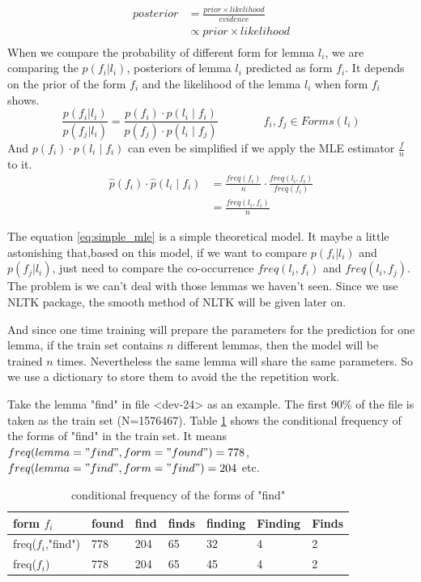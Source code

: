 \documentclass[a4paper]{article}
\begin{document}
{\begin{align*}
posterior  &= \frac{prior \times likelihood}{evidence} \\
           &\propto  prior \times likelihood \\
\end{align*}
When we compare the probability of different form for lemma $l_i$, we are comparing the $p(f_i|l_i)$, posteriors  of lemma $l_i$ predicted as form $f_i$. It depends on the prior of the form $f_i$ and the likelihood of the lemma $l_i$ when form $f_i$ shows.
\begin{equation}
\frac{p(f_i|l_i)}{p(f_j|l_i)} = \frac{p(f_i) \cdot p(l_i \mid f_i)}{  p(f_j) \cdot p(l_i \mid f_j) } \qquad \qquad  f_i,f_j \in Forms(l_i)
\end{equation}
And $p(f_i) \cdot p(l_i \mid f_i)$ can even be simplified if we apply the MLE estimator $\frac{f}{n}$ to it.
\begin{equation} 
\label{eq:simple_mle}
\begin{aligned}
\hat{p}(f_i) \cdot \hat{p}(l_i \mid f_i) &= \frac{freq(f_i)}{n} \cdot \frac{freq(l_i, f_i)}{freq(f_i)} \\
&= \frac{freq(l_i, f_i)}{n}
\end{aligned}
\end{equation}

The equation \ref{eq:simple_mle} is a simple theoretical model. It maybe a little astonishing that,based on this model, if we want to compare $p(f_i|l_i)$ and $p(f_j|l_i)$, just need to compare the co-occurrence $freq(l_i,f_i)$ and $freq(l_i,f_j)$.  The problem is we can't deal with those lemmas we haven't seen. Since we use NLTK package, the smooth method of NLTK will be given later on. 

And since one time training will prepare the parameters for the prediction for one lemma, if the train set contains $n$ different lemmas, then the model will be trained $n$ times. Nevertheless the same lemma will share the same parameters. So we use a dictionary to store them to avoid the the repetition work.


Take the lemma "find" in file <dev-24> as an example. The first 90\% of the file is taken as the train set (N=1576467). Table \ref{tb:cfd_find} shows the conditional frequency of the forms of "find" in the train set. It means $freq(lemma="find", form="found")=778$, $freq(lemma="find",form="find")=204$ etc.

\begin{table}[htb]
\centering
\begin{tabular}{|l|llllll|}
\hline
form $f_i$       & found & find & finds & finding & Finding & Finds \\ \hline
freq($f_i$,"find") & 778   & 204  & 65    & 32      & 4       & 2     \\ \hline
freq($f_i$) & 778   & 204  & 65    & 45      & 4       & 2     \\ \hline
\end{tabular}
\caption{conditional frequency of the forms of "find"}
\label{tb:cfd_find}
\end{table}

}
\end{document}
